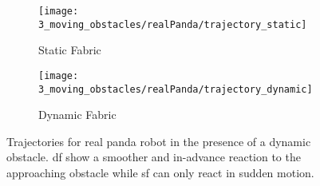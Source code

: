 \begin{figure}[ht]
  \centering
  \begin{subfigure}{0.5\linewidth}
    \centering
    \texttt{[image: 3\_moving\_obstacles/realPanda/trajectory\_static]}
    \caption{Static Fabric}%
    \label{subfig:experiment3_realPanda_trajectory_static}
  \end{subfigure}%
  \begin{subfigure}{0.5\linewidth}
    \centering
    \texttt{[image: 3\_moving\_obstacles/realPanda/trajectory\_dynamic]}
    \caption{Dynamic Fabric}%
    \label{subfig:experiment3_realPanda_trajectory_dynamic}
  \end{subfigure}
  \caption{Trajectories for real panda robot in the presence of a dynamic obstacle. \ac{df}
    show a smoother and in-advance reaction to the approaching obstacle
    while \ac{sf} can only react in sudden motion.
  }%
  \label{fig:experiment3_realPanda_example}
\end{figure}

\iffalse%
\MS{Takeaway Experiment3: Only dynamic fabrics are able to respect dynamic obstacles.}
\fi


